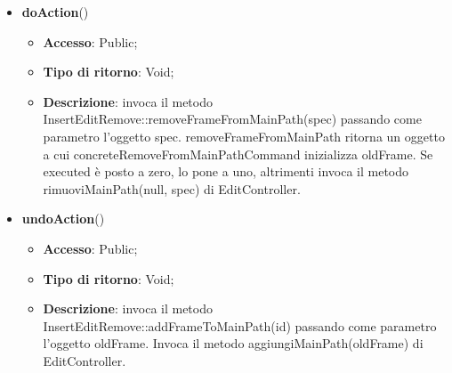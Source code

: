 {{{\begin{itemize}
				\begin{itemize}
					\item \textbf{Accesso}: Public;
					\item \textbf{Tipo di ritorno}: Void;
					\item \textbf{Descrizione}: costruisce l’oggetto concreteRemoveFromMainPathCommand.
				\end{itemize}
				\item \textbf{doAction}()
				\begin{itemize}
					\item \textbf{Accesso}: Public;
					\item \textbf{Tipo di ritorno}: Void;
					\item \textbf{Descrizione}: invoca il metodo InsertEditRemove::removeFrameFromMainPath(spec) passando come parametro l'oggetto spec.  removeFrameFromMainPath ritorna un oggetto a cui concreteRemoveFromMainPathCommand inizializza oldFrame. Se executed è posto a zero, lo pone a uno, altrimenti invoca il metodo rimuoviMainPath(null, spec) di EditController.
				\end{itemize}
				\item \textbf{undoAction}()
				\begin{itemize}
					\item \textbf{Accesso}: Public;
					\item \textbf{Tipo di ritorno}: Void;
					\item \textbf{Descrizione}: invoca il metodo InsertEditRemove::addFrameToMainPath(id) passando come parametro l'oggetto oldFrame. Invoca il metodo aggiungiMainPath(oldFrame) di EditController.
				\end{itemize}
			\end{itemize}
			}
}}
